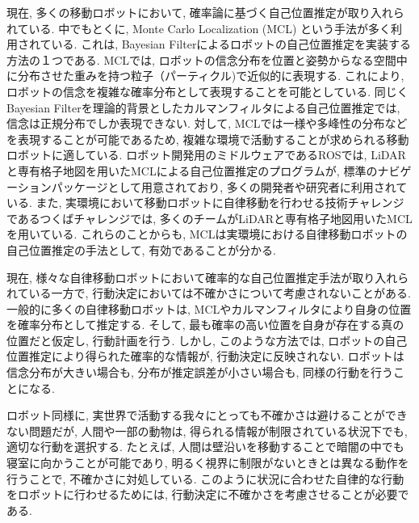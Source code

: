 現在, 多くの移動ロボットにおいて, 確率論に基づく自己位置推定が取り入れられている. 
中でもとくに, Monte Carlo Localization (MCL) という手法が多く利用されている\cite{dellaert1999, fox1999}. 
これは, Bayesian Filterによるロボットの自己位置推定を実装する方法の１つである. 
MCLでは, ロボットの信念分布を位置と姿勢からなる空間中に分布させた重みを持つ粒子（パーティクル)で近似的に表現する. 
これにより, ロボットの信念を複雑な確率分布として表現することを可能としている. 
同じくBayesian Filterを理論的背景としたカルマンフィルタによる自己位置推定では, 信念は正規分布でしか表現できない\cite{kalman1960}. 
対して, MCLでは一様や多峰性の分布などを表現することが可能であるため, 複雑な環境で活動することが求められる移動ロボットに適している. 
ロボット開発用のミドルウェアであるROSでは, LiDARと専有格子地図を用いたMCLによる自己位置推定のプログラムが, 標準のナビゲーションパッケージとして用意されており, 多くの開発者や研究者に利用されている\cite{quigley2009ros,roswiki_amcl}. 
また, 実環境において移動ロボットに自律移動を行わせる技術チャレンジであるつくばチャレンジでは, 多くのチームがLiDARと専有格子地図用いたMCLを用いている. 
\cite{夏迫2016つくばチャレンジ}
これらのことからも, MCLは実環境における自律移動ロボットの自己位置推定の手法として, 有効であることが分かる. 

現在, 様々な自律移動ロボットにおいて確率的な自己位置推定手法が取り入れられている一方で, 行動決定においては不確かさについて考慮されないことがある. 
一般的に多くの自律移動ロボットは, MCLやカルマンフィルタにより自身の位置を確率分布として推定する. 
そして, 最も確率の高い位置を自身が存在する真の位置だと仮定し, 行動計画を行う. 
しかし, このような方法では, ロボットの自己位置推定により得られた確率的な情報が, 行動決定に反映されない. 
ロボットは信念分布が大きい場合も, 分布が推定誤差が小さい場合も, 同様の行動を行うことになる. 

ロボット同様に, 実世界で活動する我々にとっても不確かさは避けることができない問題だが, 
人間や一部の動物は, 得られる情報が制限されている状況下でも, 適切な行動を選択する. 
たとえば, 人間は壁沿いを移動することで暗闇の中でも寝室に向かうことが可能であり, 
明るく視界に制限がないときとは異なる動作を行うことで, 不確かさに対処している. 
このように状況に合わせた自律的な行動をロボットに行わせるためには, 行動決定に不確かさを考慮させることが必要である. 



